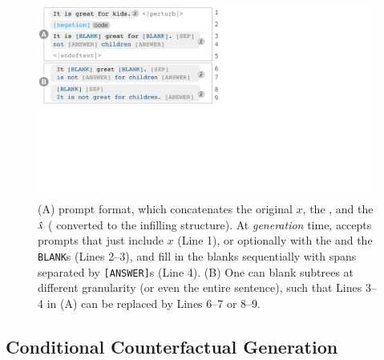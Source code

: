 \begin{figure}[t]
\centering
\includegraphics[trim={0 18.6cm 31.5cm 0cm}, clip, width=1\columnwidth]{figures/blank.pdf}
\vspace{-15pt}
\caption{ 
(A) \sysname prompt format, which concatenates the original $x$, the \tagstr, and the $\hat{x}$ ( converted to the infilling structure).
At \emph{generation} time, \sysname accepts prompts that just include $x$ (Line 1), or optionally with the \tagstrshort and the \texttt{BLANK}s (Lines 2--3), and fill in the blanks sequentially with spans separated by \texttt{[ANSWER]}s (Line 4).
(B) One can blank subtrees at different granularity (or even the entire sentence), such that Lines 3--4 in (A) can be replaced by Lines 6--7 or 8--9. 
}
\vspace{-10pt}
\label{fig:blank}
\end{figure}


\subsection{Conditional Counterfactual Generation}
\label{subsec:nlg}


\TagTable


